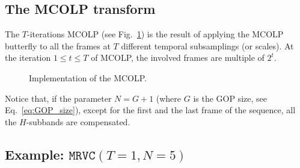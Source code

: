 



\subsection{The MCOLP transform}

The $T$-iterations MCOLP (see Fig.~\ref{fig:MCOLP}) is the result of
applying the MCOLP butterfly to all the frames at $T$ different
temporal subsamplings (or scales). At the iteration $1\leq t\leq T$ of
MCOLP, the involved frames are multiple of $2^t$.

\begin{figure}
  \centering
  
  \caption{Implementation of the MCOLP.}
  \label{fig:MCOLP}
\end{figure}

Notice that, if the parameter $N=G+1$ (where $G$ is the GOP size, see
Eq.~\ref{eq:GOP_size}), except for the first and the last frame of the
sequence, all the $H$-subbands are compensated.


\subsection{Example: $\mathtt{MRVC}(T=1, N=5)$}


